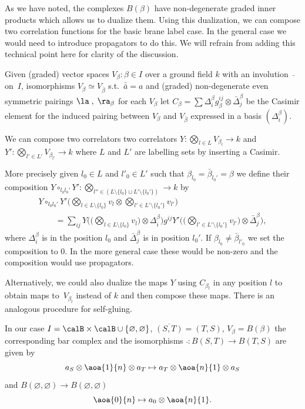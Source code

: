 As we have noted, the complexes $B(\beta)$ have non-degenerate
graded inner products which allows us to dualize them.
 Using this
dualization, we can compose two correlation functions for the basic
brane label case. In the general case we would need to introduce
propagators to do this. We will refrain from adding this technical
point here for clarity of the discussion.

Given  (graded) vector spaces $V_{\beta}: \beta\in I$ over a ground
f\/ield $k$ with an involution~$\bar{}$ on~$I$, isomorphisms
$V_{\beta}\simeq V_{\bar\beta}$ s.t.\ $\bar{\bar{a}}=a$ and (graded)
non-degenerate even symmetric pairings $\la\;,\;\ra_{\beta}$ for
each $V_{\beta}$
 let $C_{\beta}=\sum
\Delta^{\beta}_i g^{ij}_{\beta} \otimes \bar\Delta^{\beta}_j$ be the
Casimir element for the induced pairing between $V_{\beta}$ and
$V_{\bar\beta}$ expressed in a basis $(\Delta^{\beta}_i)$.


We can compose two correlators two correlators $Y:\bigotimes_{l \in
L} V_{\beta_l} \to k$ and $Y':\bigotimes_{l'\in L'}
V_{\beta_{l'}}\to k $ where $L$ and $L'$ are labelling sets by
inserting a Casimir.

More precisely given $l_0\in L$ and $l'_0\in L'$ such that
$\beta_{l_0}=\bar\beta_{l_0'}=\beta$ we def\/ine their composition
$Y\circ_{l_0l_0'} Y': \bigotimes_{l''\in (L \setminus \{l_0\} \sqcup
L' \setminus \{l_0'\})} \to k$ by
\begin{gather*}
Y\circ_{l_0l_0'} Y' \Big(\bigotimes_{l\in L\setminus \{l_0\}} v_l\otimes
\bigotimes_{l'\in L'\setminus \{l_0'\}} v_{l'}\Big) \\
\qquad{}
=\sum_{ij}
Y\bigg(\Big(\bigotimes_{l\in L\setminus \{l_0\}} v_l\Big)\otimes
\Delta^{\beta}_i\bigg)g^{ij}Y'\bigg(\Big(\bigotimes_{l'\in L'\setminus
\{l_0'\}} v_{l'}\Big)\otimes \bar \Delta^{\beta}_j\bigg),
\end{gather*}
where $\Delta^{\beta}_i$ is in the position $l_0$ and $\bar
\Delta^{\beta}_j$ is in position $l_0'$. If $\beta_{l_0}\neq
\bar\beta_{l'_0}$ we set the composition to $0$. In the more general
case these would be non-zero and the composition would use
propagators.


Alternatively, we could also dualize the maps $Y$ using
$C_{\beta_l}$ in any position $l$ to obtain maps to~$V_{\beta_l}$
instead of $k$ and then compose these maps. There is an analogous
procedure for self-gluing.

\begin{rmk}
In our case $I=\calB\times \calB\cup \{\varnothing,\varnothing\}$,
$\overline{(S,T)}=(T,S)$, $V_{\beta}=B(\beta)$ the corresponding bar
complex and the isomorphisms $\bar{}:B(S,T)\to B(T,S)$  are given by
\begin{equation*}
a_S\otimes \aoa{1}{n}\otimes a_T\mapsto a_T \otimes
\aoa{n}{1}\otimes a_S
\end{equation*}
and $B(\varnothing,\varnothing)\to B(\varnothing,\varnothing)$
\begin{equation*}
 \aoa{0}{n} \mapsto a_0 \otimes
\aoa{n}{1}.
\end{equation*}
\end{rmk}





